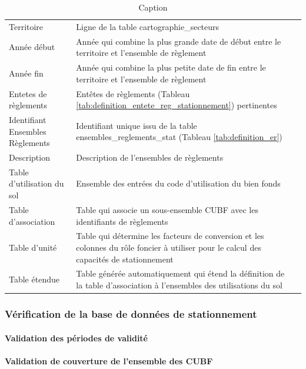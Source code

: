         \begin{table}[h]
            \centering
            \begin{tabular}{lll}
                 Territoire & Ligne de la table cartographie_secteurs  \\
                 Année début & Année qui combine la plus grande date de début entre le territoire et l'ensemble de règlement\\
                 Année fin & Année qui combine la plus petite date de fin entre le territoire et l'ensemble de règlement\\
                 Entetes de règlements & Entêtes de règlements (Tableau \ref{tab:definition_entete_reg_stationnement}) pertinentes\\
                 Identifiant Ensembles Règlements & Identifiant unique issu de la table ensembles\_reglements\_stat (Tableau \ref{tab:definition_er})\\
                 Description & Description de l'ensembles de règlements \\
                 Table d'utilisation du sol & Ensemble des entrées du code d'utilisation du bien fonds\\
                 Table d'association & Table qui associe un sous-ensemble \ac{CUBF} avec les identifiants de règlements\\
                 Table d'unité & Table qui détermine les facteurs de conversion et les colonnes du rôle foncier à utiliser pour le calcul des capacités de stationnement\\
                 Table étendue & Table générée automatiquement qui étend la définition de la table d'association à l'ensembles des utilisations du sol\\
                 
            \end{tabular}
            \caption{Caption}
            \label{tab:pr}
        \end{table}
        \par
        \subsubsection{Vérification de la base de données de stationnement}
            \paragraph{Validation des périodes de validité}
            \paragraph{Validation de couverture de l'ensemble des \ac{CUBF}}
